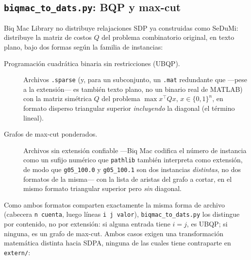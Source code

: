 \subsection{\texttt{biqmac\_to\_dats.py}: BQP y max-cut}
\label{sec:cap3-biqmac}

Biq Mac Library no distribuye relajaciones SDP ya construidas como SeDuMi:
distribuye la matriz de costos $Q$ del problema combinatorio original, en
texto plano, bajo dos formas seg\'un la familia de instancias:

\begin{description}
    \item[Programaci\'on cuadr\'atica binaria sin restricciones (UBQP).]
    Archivos \texttt{.sparse} (y, para un subconjunto, un \texttt{.mat}
    redundante que —pese a la extensi\'on— es tambi\'en texto plano, no un
    binario real de MATLAB) con la matriz sim\'etrica $Q$ del problema
    $\max x^\top Q x$, $x\in\{0,1\}^n$, en formato disperso triangular
    superior \emph{incluyendo} la diagonal (el t\'ermino lineal).
    \item[Grafos de max-cut ponderados.] Archivos sin extensi\'on confiable
    —Biq Mac codifica el n\'umero de instancia como un sufijo num\'erico que
    \texttt{pathlib} tambi\'en interpreta como extensi\'on, de modo que
    \texttt{g05\_100.0} y \texttt{g05\_100.1} son dos instancias
    \emph{distintas}, no dos formatos de la misma— con la lista de aristas
    del grafo a cortar, en el mismo formato triangular superior pero
    \emph{sin} diagonal.
\end{description}

Como ambos formatos comparten exactamente la misma forma de archivo
(cabecera \texttt{n cuenta}, luego l\'ineas \texttt{i j valor}),
\texttt{biqmac\_to\_dats.py} los distingue por contenido, no por extensi\'on:
si alguna entrada tiene $i=j$, es UBQP; si ninguna, es un grafo de max-cut.
Ambos casos exigen una transformaci\'on matem\'atica distinta hacia SDPA,
ninguna de las cuales tiene contraparte en \texttt{extern/}:

